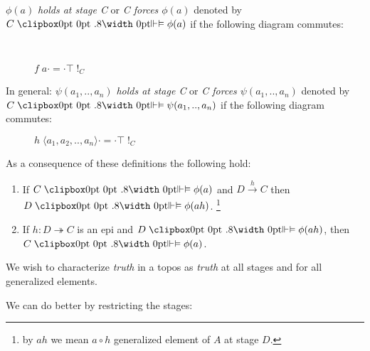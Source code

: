 \begin{definition}
	$\phi(a)$ \emph{holds at stage C} or \emph{C forces $\phi(a)$} denoted by $C \VDashA \phi(a) $ if the following diagram commutes:
	\begin{figure}[h]
		\centering
		\
		\caption{$f \; a \cdot = \cdot \top \; !_C $}	
	\end{figure}
	\newline
In general:
$\psi(a_1,..,a_n)$ \emph{holds at stage C} or \emph{C forces $\psi(a_1,..,a_n)$} denoted by $C \VDashA \psi(a_1,..,a_n) $ if the following diagram commutes:
\begin{figure}[h]
	\centering
	\caption{$h \; \langle a_1,a_2,..,a_n\rangle \cdot = \cdot \top \; !_C $}	
\end{figure}
 
\end{definition}


As a consequence of these definitions the following hold:
\begin{prop}
	\begin{enumerate}
		\item If $C \VDashA \phi(a)$ and $D \xrightarrow{h} C$ then $D \VDashA \phi(ah)$. \footnote{by $ah$ we mean $a \circ h$ generalized element of $A$ at stage $D$.}
		\item If $h: D \twoheadrightarrow C $ is an epi and $D \VDashA \phi(ah)$, then $C \VDashA \phi(a)$. 
	\end{enumerate}
\end{prop}

We wish to characterize \emph{truth} in a topos as \emph{truth} at all stages and for all generalized elements.\newline

We can do better by restricting the stages:

